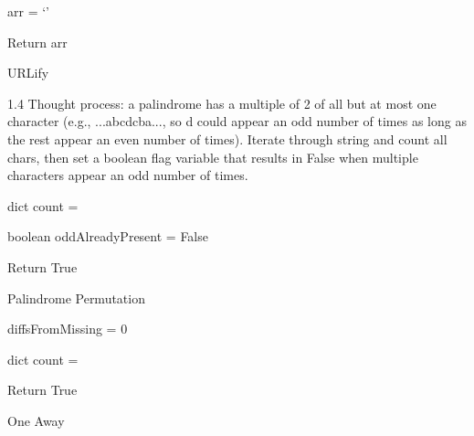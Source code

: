 \documentclass{article}
\begin{document}
\begin{algorithm}
arr = \lq\rq


 Return arr\;
 
 \caption{URLify}

\end{algorithm}



1.4
Thought process: a palindrome has a multiple of 2 of all but at most one character (e.g., ...abcdcba..., so d could appear an odd number of times as long as the rest appear an even number of times). Iterate through string and count all chars, then set a boolean flag variable that results in False when multiple characters appear an odd number of times.
\begin{algorithm}
dict count = {}

 boolean oddAlreadyPresent = False

 Return True
 
 \caption{Palindrome Permutation}

\end{algorithm}

\begin{algorithm}

diffsFromMissing = 0

dict count = {}




Return True 
 
 \caption{One Away}

\end{algorithm}
\end{document}

